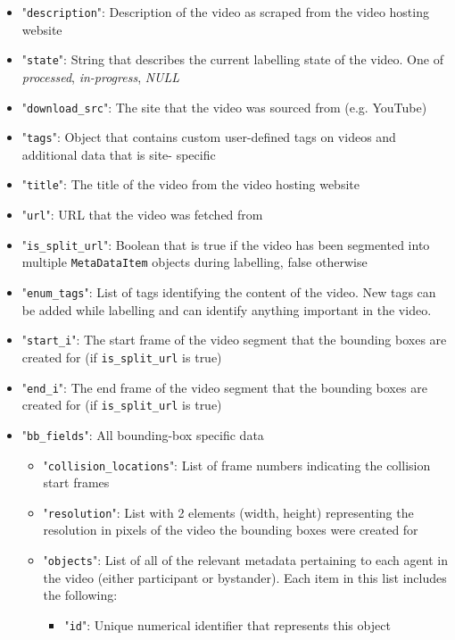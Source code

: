 \documentclass[letterpaper, 10 pt, conference]{ieeeconf}
\begin{document}
\begin{itemize}
  \item "\texttt{description}": Description of the video as scraped from the video hosting website
  \item "\texttt{state}": String that describes the current labelling state of the video. One of \textit{processed}, \textit{in-progress}, \textit{NULL}
  \item "\texttt{download\_src}": The site that the video was sourced from (e.g. YouTube)
  \item "\texttt{tags}": Object that contains custom user-defined tags on videos and additional data that is site- specific
  \item "\texttt{title}": The title of the video from the video hosting website
  \item "\texttt{url}": URL that the video was fetched from
  \item "\texttt{is\_split\_url}": Boolean that is true if the video has been segmented into multiple \texttt{MetaDataItem} objects during labelling, false otherwise
  \item "\texttt{enum\_tags}": List of tags identifying the content of the video. New tags can be added while labelling and can identify anything important in the video.
  \item "\texttt{start\_i}": The start frame of the video segment that the bounding boxes are created for (if \texttt{is\_split\_url} is true)
  \item "\texttt{end\_i}": The end frame of the video segment that the bounding boxes are created for (if \texttt{is\_split\_url} is true)
  \item "\texttt{bb\_fields}": All bounding-box specific data
  \begin{itemize}
    \item "\texttt{collision\_locations}": List of frame numbers indicating the collision start frames
    \item "\texttt{resolution}": List with 2 elements (width, height) representing the resolution in pixels of the video the bounding boxes were created for
    \item "\texttt{objects}": List of all of the relevant metadata pertaining to each agent in the video (either participant or bystander). Each item in this list includes the following:
    \begin{itemize}
      \item "\texttt{id}": Unique numerical identifier that represents this object

\end{itemize}
\end{itemize}
\end{itemize}
\end{document}
